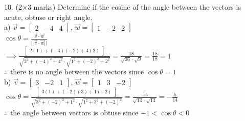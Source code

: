 \documentclass[a4paper]{article}
\begin{document}
10. (2$\times$3 marks) Determine if the cosine of the angle between the vectors is acute, obtuse or right angle.\\
a) $\vec{v} = \begin{bmatrix}
2&-4&4
\end{bmatrix}$, $\vec{w} = \begin{bmatrix}
1&-2&2
\end{bmatrix}$\\
$\cos \theta = \frac{\vec{v}\cdot\vec{w}}{||\vec{v} \cdot \vec{w}||}$\\
$\implies \frac{\begin{bmatrix}
2(1)+(-4)(-2)+4(2)
\end{bmatrix}}{\sqrt{2^2+(-4)^2+4^2} \cdot \sqrt{1^2+(-2)^2+2^2}} = \frac{18}{\sqrt{36}\cdot\sqrt{9}} = \frac{18}{18} = 1$\\
$\therefore$ there is no angle between the vectors since $\cos\theta = 1$\\
b) $\vec{v} = \begin{bmatrix}
3&-2&1
\end{bmatrix}$, $\vec{w} = \begin{bmatrix}
1&3&-2
\end{bmatrix}$\\
$\cos\theta = \frac{\begin{bmatrix}
3(1)+(-2)(3)+1(-2)
\end{bmatrix}}{\sqrt{3^2+(-2)^2+1^2}\cdot\sqrt{1^2+3^2+(-2)^2}} = \frac{-5}{\sqrt{14}\cdot\sqrt{14}} = -\frac{5}{14}$\\
$\therefore$ the angle between vectors is obtuse since $-1 < \cos\theta < 0$\\
\end{document}
